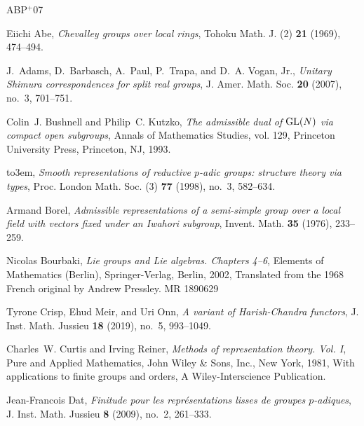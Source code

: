 \documentclass[10pt, letterpaper]{amsart}
\theoremstyle{plain}
\theoremstyle{definition}
\numberwithin{equation}{section}
\begin{document}

\newcommand{\etalchar}[1]{$^{#1}$}
\providecommand{\bysame}{\leavevmode\hbox to3em{\hrulefill}\thinspace}
\providecommand{\MR}{\relax\ifhmode\unskip\space\fi MR }
\providecommand{\MRhref}[2]{%
  \href{http://www.ams.org/mathscinet-getitem?mr=#1}{#2}
}
\providecommand{\href}[2]{#2}
\begin{thebibliography}{ABP{\etalchar{+}}07}

Eiichi Abe, \emph{Chevalley groups over local rings}, Tohoku Math. J. (2)
  \textbf{21} (1969), 474--494.

\bibitem[ABP{\etalchar{+}}07]{ABPTV}
J.~Adams, D.~Barbasch, A.~Paul, P.~Trapa, and D.~A. Vogan, Jr., \emph{Unitary
  {S}himura correspondences for split real groups}, J. Amer. Math. Soc.
  \textbf{20} (2007), no.~3, 701--751.

Colin~J. Bushnell and Philip~C. Kutzko, \emph{The admissible dual of {${\rm
  GL}(N)$} via compact open subgroups}, Annals of Mathematics Studies, vol.
  129, Princeton University Press, Princeton, NJ, 1993.

\bysame, \emph{Smooth representations of reductive {$p$}-adic groups: structure
  theory via types}, Proc. London Math. Soc. (3) \textbf{77} (1998), no.~3,
  582--634.

Armand Borel, \emph{Admissible representations of a semi-simple group over a
  local field with vectors fixed under an {I}wahori subgroup}, Invent. Math.
  \textbf{35} (1976), 233--259.

Nicolas Bourbaki, \emph{Lie groups and {L}ie algebras. {C}hapters 4--6},
  Elements of Mathematics (Berlin), Springer-Verlag, Berlin, 2002, Translated
  from the 1968 French original by Andrew Pressley. \MR{1890629}

Tyrone Crisp, Ehud Meir, and Uri Onn, \emph{A variant of {H}arish-{C}handra
  functors}, J. Inst. Math. Jussieu \textbf{18} (2019), no.~5, 993--1049.

Charles~W. Curtis and Irving Reiner, \emph{Methods of representation theory.
  {V}ol. {I}}, Pure and Applied Mathematics, John Wiley \& Sons, Inc., New
  York, 1981, With applications to finite groups and orders, A
  Wiley-Interscience Publication.

Jean-Francois Dat, \emph{Finitude pour les repr\'esentations lisses de groupes
  {$p$}-adiques}, J. Inst. Math. Jussieu \textbf{8} (2009), no.~2, 261--333.


\end{thebibliography}
\end{document}
